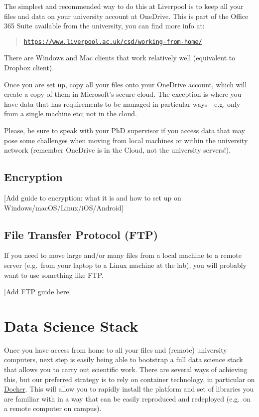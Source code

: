 \documentclass[
]{book}
\begin{document}
The simplest and recommended way to do this at Liverpool is to keep all your
files and data on your university account at OneDrive. This is part of the
Office 365 Suite available from the university, you can find more info at:

\begin{quote}
\href{https://www.liverpool.ac.uk/csd/working-from-home/}{\texttt{https://www.liverpool.ac.uk/csd/working-from-home/}}
\end{quote}

There are Windows and Mac clients that work relatively well (equivalent to
Dropbox client).

Once you are set up, copy all your files onto your OneDrive account, which
will create a copy of them in Microsoft's secure cloud. The exception is
where you have data that has requirements to be managed in particular ways - e.g.
only from a single machine etc; not in the cloud.

Please, be sure to speak with your PhD supervisor if you access data that
may pose some challenges when moving from local machines or within the university
network (remember OneDrive is in the Cloud, not the university servers!).

\hypertarget{encryption}{%
\section{Encryption}\label{encryption}}

{[}Add guide to encryption: what it is and how to set up on
Windows/macOS/Linux/iOS/Android{]}

\hypertarget{file-transfer-protocol-ftp}{%
\section{File Transfer Protocol (FTP)}\label{file-transfer-protocol-ftp}}

If you need to move large and/or many files from a local machine to a remote
server (e.g.~from your laptop to a Linux machine at the lab), you will
probably want to use something like FTP.

{[}Add FTP guide here{]}

\hypertarget{data-science-stack}{%
\chapter{Data Science Stack}\label{data-science-stack}}

Once you have access from home to all your files and (remote) university computers, next step is easily being able to bootstrap a full data science stack that allows you to carry out scientific work. There are several ways of achieving this, but our preferred strategy is to rely on container technology, in particular on \href{https://www.docker.com/}{Docker}. This will allow you to rapidly install the platform and set of libraries you are familiar with in a way that can be easily reproduced and redeployed (e.g.~on a remote computer on campus).
\end{document}

